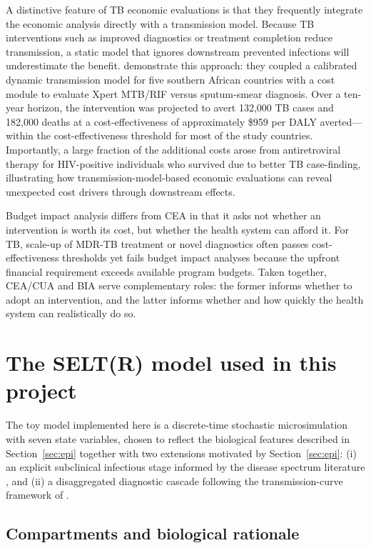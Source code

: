 \documentclass[11pt]{article}
\begin{document}
A distinctive feature of TB economic evaluations is that they frequently integrate the economic analysis directly with a transmission model. Because TB interventions such as improved diagnostics or treatment completion reduce transmission, a static model that ignores downstream prevented infections will underestimate the benefit. \citet{menzies2012xpert} demonstrate this approach: they coupled a calibrated dynamic transmission model for five southern African countries with a cost module to evaluate Xpert MTB/RIF versus sputum-smear diagnosis. Over a ten-year horizon, the intervention was projected to avert 132{,}000 TB cases and 182{,}000 deaths at a cost-effectiveness of approximately \$959 per DALY averted---within the cost-effectiveness threshold for most of the study countries. Importantly, a large fraction of the additional costs arose from antiretroviral therapy for HIV-positive individuals who survived due to better TB case-finding, illustrating how transmission-model-based economic evaluations can reveal unexpected cost drivers through downstream effects.

Budget impact analysis differs from CEA in that it asks not whether an intervention is worth its cost, but whether the health system can afford it. For TB, scale-up of MDR-TB treatment or novel diagnostics often passes cost-effectiveness thresholds yet fails budget impact analyses because the upfront financial requirement exceeds available program budgets. Taken together, CEA/CUA and BIA serve complementary roles: the former informs whether to adopt an intervention, and the latter informs whether and how quickly the health system can realistically do so.

\section{The SELT(R) model used in this project}

The toy model implemented here is a discrete-time stochastic microsimulation with seven state variables, chosen to reflect the biological features described in Section~\ref{sec:epi} together with two extensions motivated by Section~\ref{sec:epi}: (i) an explicit subclinical infectious stage informed by the disease spectrum literature \citep{richards2023spectrum, kendall2021subclinical}, and (ii) a disaggregated diagnostic cascade following the transmission-curve framework of \citet{zwerling2015modelling}.

\subsection{Compartments and biological rationale}
\end{document}
